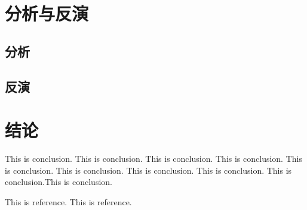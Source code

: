 \documentclass[hyperref]{ctexart}
\begin{document}
\begin{multicols}{2}
	\section{分析与反演}
	\subsection{分析}
	\subsection{反演}
	\section{结论}
	This is conclusion. This is conclusion. This is conclusion. This is conclusion. This is conclusion. This is conclusion. This is conclusion. This is conclusion. This is conclusion.This is conclusion.
	
	\begin{thebibliography}{100}%
		This is reference.%
		This is reference.%
	\end{thebibliography}
	\end{multicols}
	
\end{document}
